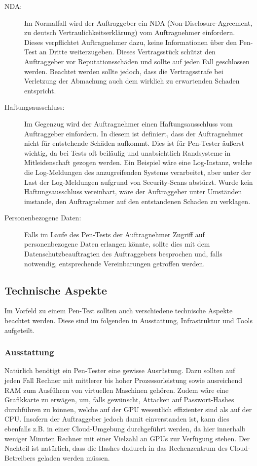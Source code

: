 \begin{description}
	\item[NDA: ] Im Normalfall wird der Auftraggeber ein NDA (Non-Disclosure-Agreement, zu deutsch Vertraulichkeitserklärung) vom Auftragnehmer einfordern. Dieses verpflichtet Auftragnehmer dazu, keine Informationen über den Pen-Test an Dritte weiterzugeben. Dieses Vertragsstück schützt den Auftraggeber vor Reputationsschäden und sollte auf jeden Fall geschlossen werden. Beachtet werden sollte jedoch, dass die Vertragsstrafe bei Verletzung der Abmachung auch dem wirklich zu erwartenden Schaden entspricht.
	
	\item[Haftungsausschluss: ] Im Gegenzug wird der Auftragnehmer einen Haftungsausschluss vom Auftraggeber einfordern. In diesem ist definiert, dass der Auftragnehmer nicht für entstehende Schäden aufkommt. Dies ist für Pen-Tester äußerst wichtig, da bei Tests oft beiläufig und unabsichtlich Randsysteme in Mitleidenschaft gezogen werden. Ein Beispiel wäre eine Log-Instanz, welche die Log-Meldungen des anzugreifenden Systems verarbeitet, aber unter der Last der Log-Meldungen aufgrund von Security-Scans abstürzt. Wurde kein Haftungsausschluss vereinbart, wäre der Auftraggeber unter Umständen imstande, den Auftragnehmer auf den entstandenen Schaden zu verklagen. 
	
	\item[Personenbezogene Daten: ] Falls im Laufe des Pen-Tests der Auftragnehmer Zugriff auf personenbezogene Daten erlangen könnte, sollte dies mit dem Datenschutzbeauftragten des Auftraggebers besprochen und, falls notwendig, entsprechende Vereinbarungen getroffen werden.
\end{description}

	\newpage
	\subsection{Technische Aspekte}
	Im Vorfeld zu einem Pen-Test sollten auch verschiedene technische Aspekte beachtet werden. Diese sind im folgenden in Ausstattung, Infrastruktur und Tools aufgeteilt.
	
		\subsubsection{Ausstattung}
		Natürlich benötigt ein Pen-Tester eine gewisse Ausrüstung. Dazu sollten auf jeden Fall Rechner mit mittlerer bis hoher Prozessorleistung sowie ausreichend RAM zum Ausführen von virtuellen Maschinen gehören. Zudem wäre eine Grafikkarte zu erwägen, um, falls gewünscht, Attacken auf Passwort-Hashes durchführen zu können, welche auf der GPU wesentlich effizienter sind als auf der CPU. Insofern der Auftraggeber jedoch damit einverstanden ist, kann dies ebenfalls z.B. in einer Cloud-Umgebung durchgeführt werden, da hier innerhalb weniger Minuten Rechner mit einer Vielzahl an GPUs zur Verfügung stehen. Der Nachteil ist natürlich, dass die Hashes dadurch in das Rechenzentrum des Cloud-Betreibers geladen werden müssen.\\
		
